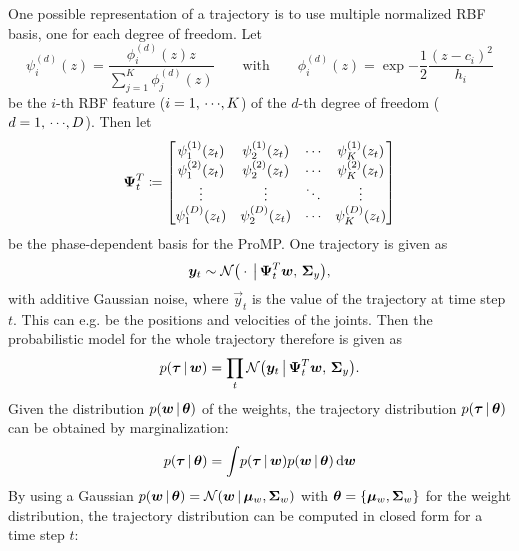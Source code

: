 			One possible representation of a trajectory is to use multiple normalized RBF basis, one for each degree of freedom. Let
			\begin{equation*}
				\psi_i^{(d)}(z) = \frac{\phi_i^{(d)}(z) z}{\sum_{j = 1}^{K} \phi_j^{(d)}(z)}
				\qquad\text{with}\qquad
				\phi_i^{(d)}(z) = \exp{ -\frac{1}{2} \frac{(z - c_i)^2}{h_i} }
			\end{equation*}
			be the \(i\)-th RBF feature (\( i = 1,\,\cdots\!,K \)) of the \(d\)-th degree of freedom (\( d = 1,\,\cdots\!,D \)). Then let
			\begin{equation*}
				\bm{\mathrm{\Psi}}_t^T \coloneqq
					\begin{bmatrix}
						\psi_1^{(1)}(z_t) & \psi_2^{(1)}(z_t) & \cdots & \psi_K^{(1)}(z_t) \\
						\psi_1^{(2)}(z_t) & \psi_2^{(2)}(z_t) & \cdots & \psi_K^{(2)}(z_t) \\
						\vdots            & \vdots            & \ddots & \vdots            \\
						\psi_1^{(D)}(z_t) & \psi_2^{(D)}(z_t) & \cdots & \psi_K^{(D)}(z_t)
					\end{bmatrix}
			\end{equation*}
			be the phase-dependent basis for the ProMP. One trajectory is given as
			\begin{equation*}
				\bm{y}_t \sim \mathcal{N}\big( \cdot \,\big\vert\, \bm{\mathrm{\Psi}}_t^T \bm{w},\, \bm{\mathrm{\Sigma}}_y \big),
			\end{equation*}
			with additive Gaussian noise, where \( \vec{y}_t \) is the value of the trajectory at time step \(t\). This can e.g. be the positions and velocities of the joints. Then the probabilistic model for the whole trajectory therefore is given as
			\begin{equation*}
				p(\bm{\tau} \,\vert\, \bm{w}) = \prod_t \mathcal{N}\big( \bm{y}_t \,\big\vert\, \bm{\mathrm{\Psi}}_t^T \bm{w},\, \bm{\mathrm{\Sigma}}_y \big).
			\end{equation*}
			Given the distribution \( p(\bm{w} \,\vert\, \bm{\theta}) \) of the weights, the trajectory distribution \( p(\bm{\tau} \,\vert\, \bm{\theta}) \) can be obtained by marginalization:
			\begin{equation*}
				p(\bm{\tau} \,\vert\, \bm{\theta}) = \int\! p(\bm{\tau} \,\vert\, \bm{w}) p(\bm{w} \,\vert\, \bm{\theta}) \dd{\bm{w}}
			\end{equation*}
			By using a Gaussian \( p(\bm{w} \,\vert\, \bm{\theta}) = \mathcal{N}(\bm{w} \,\vert\, \bm{\mu}_w, \bm{\mathrm{\Sigma}}_w) \) with \( \bm{\theta} = \{ \bm{\mu}_w, \bm{\mathrm{\Sigma}}_w \} \) for the weight distribution, the trajectory distribution can be computed in closed form for a time step \(t\):
